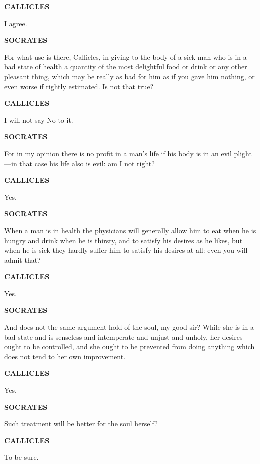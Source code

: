 \documentclass[11pt,letter]{article}
\begin{document}
\par \textbf{CALLICLES}
\par   I agree.

\par \textbf{SOCRATES}
\par   For what use is there, Callicles, in giving to the body of a sick man who is in a bad state of health a quantity of the most delightful food or drink or any other pleasant thing, which may be really as bad for him as if you gave him nothing, or even worse if rightly estimated. Is not that true?

\par \textbf{CALLICLES}
\par   I will not say No to it.

\par \textbf{SOCRATES}
\par   For in my opinion there is no profit in a man’s life if his body is in an evil plight—in that case his life also is evil:  am I not right?

\par \textbf{CALLICLES}
\par   Yes.

\par \textbf{SOCRATES}
\par   When a man is in health the physicians will generally allow him to eat when he is hungry and drink when he is thirsty, and to satisfy his desires as he likes, but when he is sick they hardly suffer him to satisfy his desires at all:  even you will admit that?

\par \textbf{CALLICLES}
\par   Yes.

\par \textbf{SOCRATES}
\par   And does not the same argument hold of the soul, my good sir? While she is in a bad state and is senseless and intemperate and unjust and unholy, her desires ought to be controlled, and she ought to be prevented from doing anything which does not tend to her own improvement.

\par \textbf{CALLICLES}
\par   Yes.

\par \textbf{SOCRATES}
\par   Such treatment will be better for the soul herself?

\par \textbf{CALLICLES}
\par   To be sure.
\end{document}
